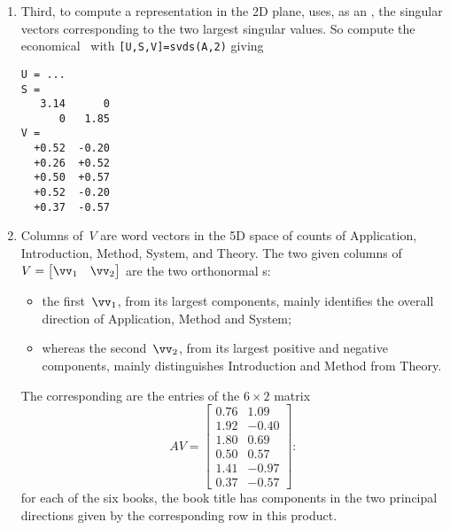 \begin{enumerate}
\item Third, to compute a representation in the 2D plane,  uses, as an , the singular vectors corresponding to the two largest singular values.  
So compute the economical \svd\ with \verb|[U,S,V]=svds(A,2)| giving \twodp
\begin{verbatim}
U = ...
S =
   3.14      0
      0   1.85
V =
  +0.52  -0.20
  +0.26  +0.52
  +0.50  +0.57
  +0.52  -0.20
  +0.37  -0.57
\end{verbatim}

\item Columns of~\(V\) are word vectors in the 5D space of counts of Application, Introduction, Method, System, and Theory.
The two given columns of \(V=\begin{bmatrix} \vv_1&\vv_2 \end{bmatrix}\) are the two orthonormal s:
\begin{itemize}
\item the first~\(\vv_1\), from its largest components, mainly identifies the overall direction of Application, Method and System;
\item whereas the second~\(\vv_2\), from its largest positive and negative components, mainly distinguishes Introduction and Method from Theory.
\end{itemize}
The corresponding  are the entries of the \(6\times 2\) matrix
\begin{equation*}
AV=\begin{bmatrix} 0.76 & 1.09 \\
1.92 & -0.40 \\
1.80 & 0.69 \\
0.50 & 0.57 \\
1.41 & -0.97 \\
0.37 & -0.57 \end{bmatrix}:
\end{equation*}
for each of the six books, the book title has components in the two principal directions given by the corresponding row in this product.
\end{enumerate}

